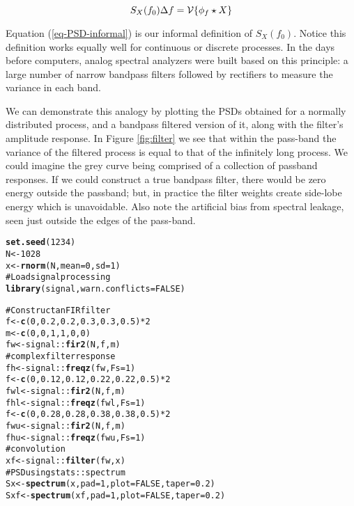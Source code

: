 \documentclass[10pt]{article}\usepackage{graphicx, color}
\makeatletter
\newcommand{\hlfunctioncall}[1]{\textcolor[rgb]{0.501960784313725,0,0.329411764705882}{\textbf{#1}}}%
\newcommand{\hlcomment}[1]{\textcolor[rgb]{0.180392156862745,0.6,0.341176470588235}{#1}}%
\newenvironment{kframe}{%
 \def\at@end@of@kframe{}%
 \ifinner\ifhmode%
  \def\at@end@of@kframe{\end{minipage}}%
  \begin{minipage}{\columnwidth}%
 \fi\fi%
 \def\FrameCommand##1{\hskip\@totalleftmargin \hskip-\fboxsep
 \colorbox{shadecolor}{##1}\hskip-\fboxsep
     \hskip-\linewidth \hskip-\@totalleftmargin \hskip\columnwidth}%
 \MakeFramed {\advance\hsize-\width
   \@totalleftmargin\z@ \linewidth\hsize
   \@setminipage}}%
 {\par\unskip\endMakeFramed%
 \at@end@of@kframe}
\newenvironment{knitrout}{}{} %
\makeatother
\begin{document}
\begin{equation}
\label{eq-PSD-informal}
S_X ( f_0 ) \Delta f = \mathcal{V} \{\phi_f \star X\}
\end{equation}

Equation (\ref{eq-PSD-informal}) is our informal definition of $S_X ( f_0 )$. 
Notice this definition works equally well for continuous
or discrete processes. 
In the days before computers, 
analog spectral analyzers were built based on this 
principle: a large number of narrow bandpass filters
followed by rectifiers to measure the variance in each band.

We can demonstrate this analogy by plotting the 
PSDs obtained for a normally distributed process, and
a bandpass filtered version of it, along with
the filter's amplitude response.
In Figure \ref{fig:filter} we see that
within the pass-band the variance
of the filtered process
is equal to that of the infinitely long process.
We could imagine the grey curve being comprised of a 
collection of passband responses.
If we could construct a true bandpass filter, there would be 
zero energy outside the passband; but, in practice 
the filter weights create side-lobe 
energy which is unavoidable.
Also note the artificial bias
from spectral leakage, seen just outside the 
edges of the pass-band.
%
\begin{knitrout}
\color{fgcolor}\begin{kframe}
\begin{alltt}
\hlfunctioncall{set.seed}(1234)
N <- 1028
x <- \hlfunctioncall{rnorm}(N, mean = 0, sd = 1)
\hlcomment{# Load signal processing}
\hlfunctioncall{library}(signal, warn.conflicts = FALSE)
\end{alltt}


{\ttfamily\noindent\itshape\color{messagecolor}{\#\# Loading required package: MASS}}\begin{alltt}
\hlcomment{# Construct an FIR filter}
f <- \hlfunctioncall{c}(0, 0.2, 0.2, 0.3, 0.3, 0.5) * 2
m <- \hlfunctioncall{c}(0, 0, 1, 1, 0, 0)
fw <- signal::\hlfunctioncall{fir2}(N, f, m)
\hlcomment{# complex filter response}
fh <- signal::\hlfunctioncall{freqz}(fw, Fs = 1)
f <- \hlfunctioncall{c}(0, 0.12, 0.12, 0.22, 0.22, 0.5) * 2
fwl <- signal::\hlfunctioncall{fir2}(N, f, m)
fhl <- signal::\hlfunctioncall{freqz}(fwl, Fs = 1)
f <- \hlfunctioncall{c}(0, 0.28, 0.28, 0.38, 0.38, 0.5) * 2
fwu <- signal::\hlfunctioncall{fir2}(N, f, m)
fhu <- signal::\hlfunctioncall{freqz}(fwu, Fs = 1)
\hlcomment{# convolution}
xf <- signal::\hlfunctioncall{filter}(fw, x)
\hlcomment{# PSD using stats::spectrum}
Sx <- \hlfunctioncall{spectrum}(x, pad = 1, plot = FALSE, taper = 0.2)
Sxf <- \hlfunctioncall{spectrum}(xf, pad = 1, plot = FALSE, taper = 0.2)
\end{alltt}
\end{kframe}
\end{knitrout}
\end{document}
